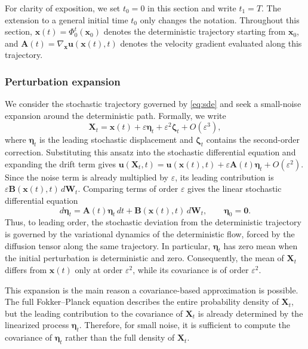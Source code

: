\documentclass[a4paper,11pt]{article}
\numberwithin{equation}{section}
\theoremstyle{plain}
\theoremstyle{definition}
\theoremstyle{remark}
\newcommand{\bx}{\mathbf{x}}
\newcommand{\bu}{\mathbf{u}}
\newcommand{\bX}{\mathbf{X}}
\newcommand{\bW}{\mathbf{W}}
\newcommand{\bA}{\mathbf{A}}
\newcommand{\bB}{\mathbf{B}}
\newcommand{\bzero}{\mathbf{0}}
\newcommand{\etaVec}{\boldsymbol{\eta}}
\newcommand{\flow}[2]{\Phi_{#1}^{#2}}
\begin{document}
For clarity of exposition, we set \(t_0=0\) in this section and write \(t_1=T\).  The extension to a general initial time \(t_0\) only changes the notation.  Throughout this section, \(\bx(t)=\flow{0}{t}(\bx_0)\) denotes the deterministic trajectory starting from \(\bx_0\), and \(\bA(t)=\nabla_{\bx}\bu(\bx(t),t)\) denotes the velocity gradient evaluated along this trajectory.

\subsubsection{Perturbation expansion}

We consider the stochastic trajectory governed by \eqref{eq:sde} and seek a small-noise expansion around the deterministic path.  Formally, we write
\begin{equation}
    \bX_t=\bx(t)+\varepsilon\etaVec_t+\varepsilon^2\boldsymbol{\zeta}_t+O(\varepsilon^3),
    \label{eq:small_noise_expansion}
\end{equation}
where \(\etaVec_t\) is the leading stochastic displacement and \(\boldsymbol{\zeta}_t\) contains the second-order correction.  Substituting this ansatz into the stochastic differential equation and expanding the drift term gives \(\bu(\bX_t,t)=\bu(\bx(t),t)+\varepsilon\bA(t)\etaVec_t+O(\varepsilon^2)\).  Since the noise term is already multiplied by \(\varepsilon\), its leading contribution is \(\varepsilon\bB(\bx(t),t)\,d\bW_t\).  Comparing terms of order \(\varepsilon\) gives the linear stochastic differential equation
\begin{equation}
    d\etaVec_t=\bA(t)\etaVec_t\,dt+\bB(\bx(t),t)\,d\bW_t,
    \qquad \etaVec_0=\bzero .
    \label{eq:linearized_eta}
\end{equation}
Thus, to leading order, the stochastic deviation from the deterministic trajectory is governed by the variational dynamics of the deterministic flow, forced by the diffusion tensor along the same trajectory.  In particular, \(\etaVec_t\) has zero mean when the initial perturbation is deterministic and zero.  Consequently, the mean of \(\bX_t\) differs from \(\bx(t)\) only at order \(\varepsilon^2\), while its covariance is of order \(\varepsilon^2\).

This expansion is the main reason a covariance-based approximation is possible.  The full Fokker--Planck equation describes the entire probability density of \(\bX_t\), but the leading contribution to the covariance of \(\bX_t\) is already determined by the linearized process \(\etaVec_t\).  Therefore, for small noise, it is sufficient to compute the covariance of \(\etaVec_t\) rather than the full density of \(\bX_t\).
\end{document}
